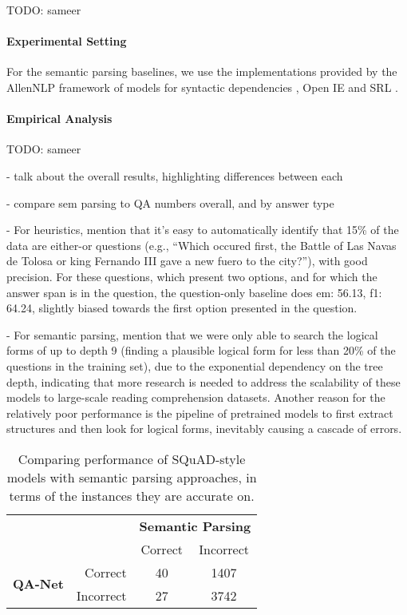 
TODO: sameer

\paragraph{Experimental Setting}
For the semantic parsing baselines, we use the implementations 
provided by the AllenNLP \cite{Gardner2017AllenNLP} framework of models for syntactic dependencies \cite{Dozat2017StanfordsGN}, Open IE \cite{Stanovsky2018SupervisedOI} and SRL \cite{He2017DeepSR}.


\paragraph{Empirical Analysis}

TODO: sameer

- talk about the overall results, highlighting differences between each

- compare sem parsing to QA numbers overall, and by answer type

- For heuristics, mention that it's easy to automatically identify
that 15\% of the data are either-or questions (e.g., ``Which occured first, the Battle of Las Navas de Tolosa or king Fernando III gave a new fuero to the city?''), with good precision. 
For these questions, which present two options, and for which the answer span is in the question, the question-only baseline does
em: 56.13,  f1: 64.24, slightly biased towards the first option presented in the question.

- For semantic parsing, mention that we were only able to search 
the logical forms of up to depth 9 (finding a plausible logical form for less than 20\% of the questions in the training set), due to the exponential dependency on the tree depth, indicating that more research is needed to address the scalability of these models to large-scale reading comprehension datasets. Another reason for the relatively poor performance is the pipeline of pretrained models to first extract structures and then look for logical forms, inevitably causing a cascade of errors.

\begin{table}
    \centering
    \small
    \begin{tabular}{crcc}
        &&\multicolumn{2}{c}{\bf Semantic Parsing} \\
        && { Correct} & { Incorrect} \\
        \cline{3-4}
    \multirow{2}{*}{\bf QA-Net}&{ Correct} & \multicolumn{1}{|c|}{40} & \multicolumn{1}{|c|}{1407}\\
        \cline{3-4}
    &{ Incorrect} & \multicolumn{1}{|c|}{27} & \multicolumn{1}{|c|}{3742}\\
        \cline{3-4}
    \end{tabular}
    \caption{Comparing performance of SQuAD-style models with semantic parsing approaches, in terms of the instances they are accurate on.}
    \label{tab:my_label}
\end{table}

